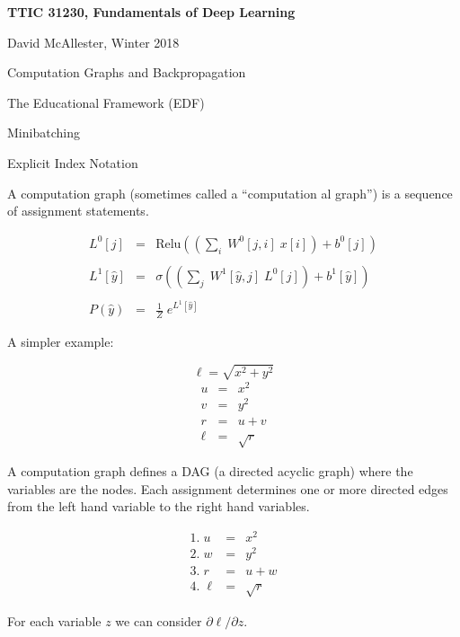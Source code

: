 



{\Huge
  
  \centerline{\bf TTIC 31230, Fundamentals of Deep Learning}
  \bigskip
  \centerline{David McAllester, Winter 2018}
  \vfill
  \vfill
  \centerline{Computation Graphs and Backpropagation}
  \vfill
  \centerline{The Educational Framework (EDF)}
  \vfill
  \centerline{Minibatching}
  \vfill
  \centerline{Explicit Index Notation}
  \vfill
  \vfill


A computation graph (sometimes called a ``computation{\color{red} al} graph'') is a sequence of assignment statements.


\vfill
\begin{eqnarray*}
  L^0[j] & = & \mathrm{Relu}\left(\left(\sum_i\;W^0[j,i] \;x[i]\right) + b^0[j]\right) \\
  \\
  L^1[\hat{y}] & = & \sigma\left(\left(\sum_j\;W^1[\hat{y},j]\;L^0[j]\right) + b^1[\hat{y}]\right) \\
  \\
  P(\hat{y}) & = & \frac{1}{Z} \;e^{L^1[\hat{y}]}
\end{eqnarray*}

A simpler example:

\vfill
$$\ell = \sqrt{x^2 + y^2}$$
\begin{eqnarray*}
  u & = & x^2  \\
  v & = & y^2 \\
  r & =& u + v \\
  \ell & = & \sqrt{r}
\end{eqnarray*}

\vfill
A computation graph defines a DAG (a directed acyclic graph) where the variables are the nodes. Each assignment determines
one or more directed edges from the left hand variable to the right hand variables.

\vspace{-1ex}
$$\begin{array}{lcl}
 1.\;u & = & x^2  \\
 2.\;w & = & y^2 \\
 3.\;r & =& u + w \\
  4.\;\ell & = & \sqrt{r}
\end{array}$$

\vfill
For each variable $z$ we can consider $\partial \ell/\partial z$.

}
